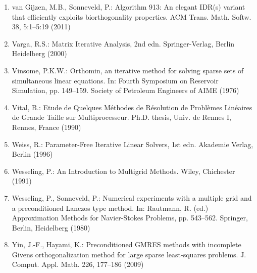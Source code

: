 \begin{enumerate}[label=\arabic*.,ref=\arabic*,leftmargin=3em]
\item\label{bib:source-199}van Gijzen, M.B., Sonneveld, P.: Algorithm 913: An elegant IDR(s) variant that efficiently exploits biorthogonality properties. ACM Trans. Math. Softw. 38, 5:1–5:19 (2011)

\item\label{bib:source-200}Varga, R.S.: Matrix Iterative Analysis, 2nd edn. Springer-Verlag, Berlin Heidelberg (2000)

\item\label{bib:source-201}Vinsome, P.K.W.: Orthomin, an iterative method for solving sparse sets of simultaneous linear equations. In: Fourth Symposium on Reservoir Simulation, pp. 149–159. Society of Petroleum Engineers of AIME (1976)

\item\label{bib:source-202}Vital, B.: Etude de Quelques Méthodes de Résolution de Problèmes Linéaires de Grande Taille sur Multiprocesseur. Ph.D. thesis, Univ. de Rennes I, Rennes, France (1990)

\item\label{bib:source-203}Weiss, R.: Parameter-Free Iterative Linear Solvers, 1st edn. Akademie Verlag, Berlin (1996)

\item\label{bib:source-204}Wesseling, P.: An Introduction to Multigrid Methods. Wiley, Chichester (1991)

\item\label{bib:source-205}Wesseling, P., Sonneveld, P.: Numerical experiments with a multiple grid and a preconditioned Lanczos type method. In: Rautmann, R. (ed.) Approximation Methods for Navier-Stokes Problems, pp. 543–562. Springer, Berlin, Heidelberg (1980)

\item\label{bib:source-206}Yin, J.-F., Hayami, K.: Preconditioned GMRES methods with incomplete Givens orthogonalization method for large sparse least-squares problems. J. Comput. Appl. Math. 226, 177–186 (2009)


\end{enumerate}
